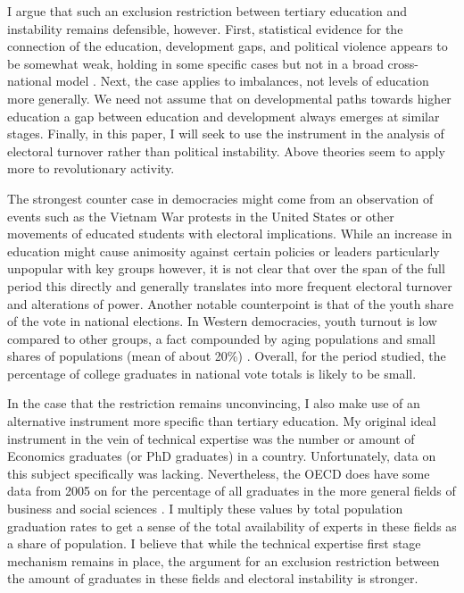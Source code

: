 \documentclass{article}
\begin{document}
    I argue that such an exclusion restriction between tertiary education and instability remains defensible, however. First, statistical evidence for the connection of the education, development gaps, and political violence appears to be somewhat weak, holding in some specific cases but not in a broad cross-national model \citep{hibbs_jr_mass_1973}. Next, the case applies to imbalances, not levels of education more generally. We need not assume that on developmental paths towards higher education a gap between education and development always emerges at similar stages. Finally, in this paper, I will seek to use the instrument in the analysis of electoral turnover rather than political instability. Above theories seem to apply more to revolutionary activity.

    The strongest counter case in democracies might come from an observation of events such as the Vietnam War protests in the United States or other movements of educated students with electoral implications. While an increase in education might cause animosity against certain policies or leaders particularly unpopular with key groups however, it is not clear that over the span of the full period this directly and generally translates into more frequent electoral turnover and alterations of power. Another notable counterpoint is that of the youth share of the vote in national elections. In Western democracies, youth turnout is low compared to other groups, a fact compounded by aging populations and small shares of populations (mean of about 20\%) \citep{institute_for_democracy_and_electoral_assistance_youth_1999}. Overall, for the period studied, the percentage of college graduates in national vote totals is likely to be small.

    In the case that the restriction remains unconvincing, I also make use of an alternative instrument more specific than tertiary education. My original ideal instrument in the vein of technical expertise was the number or amount of Economics graduates (or PhD graduates) in a country. Unfortunately, data on this subject specifically was lacking. Nevertheless, the OECD does have some data from 2005 on for the percentage of all graduates in the more general fields of business and social sciences \citep{oecd_students_2020}. I multiply these values by total population graduation rates to get a sense of the total availability of experts in these fields as a share of population. I believe that while the technical expertise first stage mechanism remains in place, the argument for an exclusion restriction between the amount of graduates in these fields and electoral instability is stronger.
\end{document}
